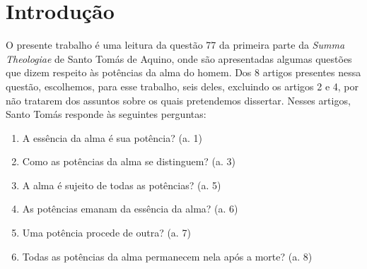 \documentclass[
	article,			%
	12pt,				%
	oneside,			%
	a4paper,			%
	english,			%
	brazil,				%
	sumario=tradicional,
	doublespacing
	]{abntex2}
\begin{document}
\frenchspacing 




%
%
\maketitle


\textual

\section*{Introdução}

O presente trabalho é uma leitura da questão 77 da primeira parte da \textit{Summa Theologiae} de Santo Tomás de Aquino, onde são apresentadas algumas questões que dizem respeito às potências da alma do homem\cite{tomas_de_aquino_as_2002}. Dos 8 artigos presentes nessa questão, escolhemos, para esse trabalho, seis deles, excluindo os artigos 2 e  4, por não tratarem dos assuntos sobre os quais pretendemos dissertar. Nesses artigos, Santo Tomás responde às seguintes perguntas:
\begin{enumerate}
    \item A essência da alma é sua potência? (a. 1)
    \item Como as potências da alma se distinguem? (a. 3)
    \item A alma é sujeito de todas as potências? (a. 5)
    \item As potências emanam da essência da alma? (a. 6)
    \item Uma potência procede de outra? (a. 7)
    \item Todas as potências da alma permanecem nela após a morte? (a. 8)
\end{enumerate}
\end{document}
